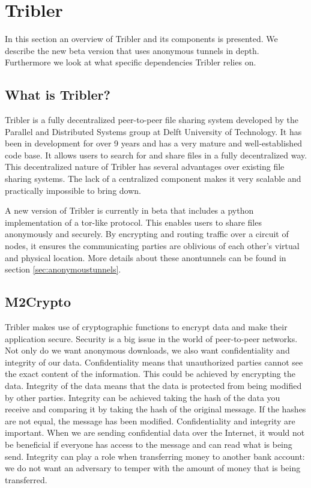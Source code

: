 \section{Tribler}
	\label{scc:tribler}
	In this section an overview of Tribler and its components is presented. We describe the new beta version that uses anonymous tunnels in depth. Furthermore we look at what specific dependencies Tribler relies on.

	\subsection{What is Tribler?}
		Tribler is a fully decentralized peer-to-peer file sharing system developed by the Parallel and Distributed Systems group at Delft University of Technology. It has been in development for over 9 years and has a very mature and well-established code base. It allows users to search for and share files in a fully decentralized way. This decentralized nature of Tribler has several advantages over existing file sharing systems. The lack of a centralized component makes it very scalable and practically impossible to bring down.
		
		A new version of Tribler is currently in beta that includes a python implementation of a tor-like protocol. This enables users to share files anonymously and securely. By encrypting and routing traffic over a circuit of nodes, it ensures the communicating parties are oblivious of each other's virtual and physical location. More details about these anontunnels can be found in section \ref{sec:anonymoustunnels}.

	\subsection{M2Crypto}
		Tribler makes use of cryptographic functions to encrypt data and make their application secure. Security is a big issue in the world of peer-to-peer networks. Not only do we want anonymous downloads, we also want confidentiality and integrity of our data. Confidentiality means that unauthorized parties cannot see the exact content of the information. This could be achieved by encrypting the data. Integrity of the data means that the data is protected from being modified by other parties. Integrity can be achieved taking the hash of the data you receive and comparing it by taking the hash of the original message. If the hashes are not equal, the message has been modified. Confidentiality and integrity are important. When we are sending confidential data over the Internet, it would not be beneficial if everyone has access to the message and can read what is being send. Integrity can play a role when transferring money to another bank account: we do not want an adversary to temper with the amount of money that is being transferred.
		
